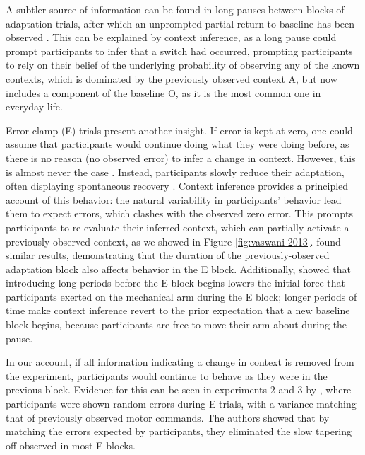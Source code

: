 \documentclass[a4paper,doc,floatsintext,natbib]{apa6}%
\def \fref #1{Figure \ref{#1}}     %
\begin{document}
A subtler source of information can be found in long pauses between blocks of adaptation trials, after which an unprompted partial return to baseline has been observed \cite{Ethier_Spontaneous_2008}. This can be explained by context inference, as a long pause could prompt participants to infer that a switch had occurred, prompting participants to rely on their belief of the underlying probability of observing any of the known contexts, which is dominated by the previously observed context A, but now includes a component of the baseline O, as it is the most common one in everyday life.

Error-clamp (E) trials present another insight. If error is kept at zero, one could assume that participants would continue doing what they were doing before, as there is no reason (no observed error) to infer a change in context. However, this is almost never the case \cite[e.g.][]{Smith_Interacting_2006,Ethier_Spontaneous_2008,Forano_Timescales_2020,Vaswani_Decay_2013,Scheidt_Persistence_2000,Pekny_Protection_2011}. Instead, participants slowly reduce their adaptation, often displaying spontaneous recovery \cite[e.g.][]{Smith_Interacting_2006}. Context inference provides a principled account of this behavior: the natural variability in participants' behavior lead them to expect errors, which clashes with the observed zero error. This prompts participants to re-evaluate their inferred context, which can partially activate a previously-observed context, as we showed in \fref{fig:vaswani-2013}. \cite{Pekny_Protection_2011} found similar results, demonstrating that the duration of the previously-observed adaptation block also affects behavior in the E block. Additionally, \cite{Criscimagna-Hemminger_Consolidation_2008} showed that introducing long periods before the E block begins lowers the initial force that participants exerted on the mechanical arm during the E block; longer periods of time make context inference revert to the prior expectation that a new baseline block begins, because participants are free to move their arm about during the pause.

In our account, if all information indicating a change in context is removed from the experiment, participants would continue to behave as they were in the previous block. Evidence for this can be seen in experiments 2 and 3 by \cite{Vaswani_Decay_2013}, where participants were shown random errors during E trials, with a variance matching that of previously observed motor commands. The authors showed that by matching the errors expected by participants, they eliminated the slow tapering off observed in most E blocks.
\end{document}
